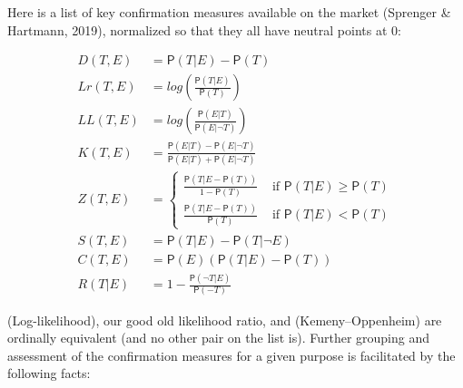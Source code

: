 \documentclass[
  10pt,
  dvipsnames,enabledeprecatedfontcommands]{scrartcl}
\newcommand{\n}{\neg}
\newcommand{\pr}[1]{\mathsf{P}(#1)}
\begin{document}
Here is a list of key confirmation measures available on the market
(Sprenger \& Hartmann, 2019), normalized so that they all have neutral
points at 0:

\begin{align}
\tag{Difference}  D(T,E) & = \pr{T\vert E} - \pr{T}\\
\tag{Log-ratio}  Lr(T,E) &  = log\left(\frac{\pr{T\vert E}}{\pr{T}} \right) \\
\tag{Log-likelihood}   LL(T,E) & = log\left(\frac{\pr{E \vert T}}{\pr{E \vert \n T}} \right)\\
\tag{Kemeny-Oppenheim}  K(T,E) & = \frac{\pr{E\vert T} - \pr{E \vert \n T}}{\pr{E \vert T} + \pr{E \vert \n T}} \\
\tag{Generalized entailment}  Z(T,E) & = \begin{cases}
\frac{\pr{T\vert E - \pr{T}}}{1-\pr{T}} & \mbox{ if } \pr{T \vert E} \geq \pr{T}\\
\frac{\pr{T\vert E - \pr{T}}}{\pr{T}} & \mbox{ if } \pr{T \vert E} < \pr{T}
\end{cases} \\
\tag{Christensen-Joyce} S(T,E) & = \pr{T \vert E} - \pr{T \vert \n E} \\
\tag{Carnap}  C(T,E) & = \pr{E}(\pr{T\vert E} - \pr{T})\\
\tag{Rips} R(T\vert E) & = 1 - \frac{\pr{\n T\vert E}}{\pr{-T}}
\end{align}

(Log-likelihood), our good old likelihood ratio, and (Kemeny--Oppenheim)
are ordinally equivalent (and no other pair on the list is). Further
grouping and assessment of the confirmation measures for a given purpose
is facilitated by the following facts:
\end{document}
